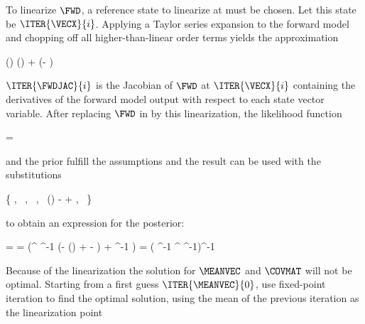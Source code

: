 \startsubsection[title=Iterative Solutions]

    To linearize $\FWD$, a reference state to linearize at must be chosen.
    Let this state be $\ITER{\VECX}{i}$. Applying a Taylor series
    expansion to the forward model and chopping off all higher-than-linear
    order terms yields the approximation

    \startformula
        \FWD(\VECX) \approx \FWD()
            +  (\VECX - ) \EQSTOP
    \stopformula

    $\ITER{\FWDJAC}{i}$ is the Jacobian of $\FWD$ at $\ITER{\VECX}{i}$
    containing the derivatives of the forward model output with respect to each
    state vector variable. After replacing $\FWD$ in
     by this linearization, the likelihood function

    \startformula
        \LIKELIHOOD = 
    \stopformula

    and the prior  fulfill the assumptions
     and the result  can be used with
    the substitutions

    \startformula
        \{ \VECA \rightarrow \MEANVECA,~
        \MATPI \rightarrow \COVMATA,~
        \MATB \rightarrow {},~
        \VECB \rightarrow \FWD()
            -  
            + \MEANVECERR,~
        \MATQI \rightarrow \COVMATERR \}
    \stopformula

    to obtain an expression for the posterior:
    
    \startformula
    \startalign[n=2,align={right,left}]
        \NC \POSTERIOR = \NC \GAUSS{\VECX}{\MEANVEC}{\COVMAT} \NR
        \NC \MEANVEC = \NC \COVMAT (^\top
            \COVMATERR^{-1} (\VECY - \FWD()
            +   - \MEANVECERR)
            + \COVMATA^{-1} \MEANVECA) \NR
        \NC \COVMAT = \NC 
            ( \COVMATERR^{-1} ^\top
            \COVMATA^{-1})^{-1} \NR
    \stopalign
    \stopformula
    
    Because of the linearization the solution for $\MEANVEC$ and $\COVMAT$ will
    not be optimal. Starting from a first guess $\ITER{\MEANVEC}{0}$, use
    fixed-point iteration to find the optimal solution, using the mean of the
    previous iteration as the linearization point

